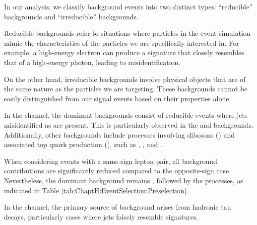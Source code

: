 In our analysis, we classify background events into two distinct types:  
``reducible'' backgrounds and ``irreducible'' backgrounds.

Reducible backgrounds refer to situations where particles in the event 
simulation mimic the characteristics of the particles we are specifically 
interested in. For example, a high-energy electron can produce a signature 
that closely resembles that of a high-energy photon, leading to misidentification.

On the other hand, irreducible backgrounds involve physical objects that are of 
the same nature as the particles we are targeting. These backgrounds cannot be 
easily distinguished from our signal events based on their properties alone.


In the \dileptau channel, the dominant backgrounds consist of reducible events 
where jets misidentified as \tauhad are present. This is particularly observed in 
the \ttbar and \Zjets backgrounds. Additionally, other backgrounds include processes 
involving dibosons (\diboson) and associated top quark production (\ttX), such 
as \ttH, \ttZ, and \ttW.

When considering events with a same-sign lepton pair, all background contributions 
are significantly reduced compared to the opposite-sign case. Nevertheless, the dominant 
background remains \ttbar, followed by the \ttX processes, as indicated in Table \ref{tab:ChaptH:EventSelection:Preselection}.

In the \dileptau channel, the primary source of background arises from hadronic 
tau decays, particularly cases where jets falsely resemble \tauhad signatures.



